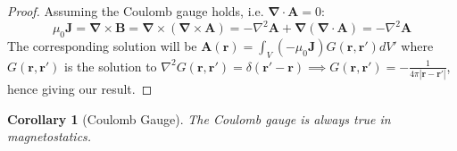 \documentclass[a4paper]{article}
\theoremstyle{new}
\newtheorem{cor}{Corollary}[section]
\begin{document}
\begin{proof}
Assuming the Coulomb gauge holds, i.e. $\boldsymbol{\nabla}\cdot\mathbf{A}=0$: 
$$\mu_0\mathbf{J}=\boldsymbol{\nabla}\times\mathbf{B}=\boldsymbol{\nabla}\times(\boldsymbol{\nabla}\times\mathbf{A})=-\nabla^2\mathbf{A}+\boldsymbol{\nabla}(\boldsymbol{\nabla}\cdot\mathbf{A})=-\nabla^2\mathbf{A}$$
The corresponding solution will be $\mathbf{A}(\mathbf{r})=\int_V(-\mu_0\mathbf{J})G(\mathbf{r},\mathbf{r'})dV'$ where $G(\mathbf{r},\mathbf{r'})$ is the solution to $\nabla^2G(\mathbf{r},\mathbf{r'})=\delta(\mathbf{r'}-\mathbf{r})\implies G(\mathbf{r},\mathbf{r'})=-\frac{1}{4\pi|\mathbf{r}-\mathbf{r'}|}$, hence giving our result.
\end{proof}
\begin{cor}[Coulomb Gauge]
The Coulomb gauge is always true in magnetostatics.
\end{cor}
\end{document}
